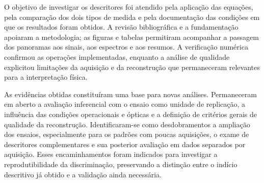 O objetivo de investigar os descritores foi atendido pela aplicação das equações, pela
comparação dos dois tipos de medida e pela documentação das condições em que os resultados
foram obtidos. A revisão bibliográfica e a fundamentação apoiaram a metodologia; as figuras
e tabelas permitiram acompanhar a passagem dos panoramas aos sinais, aos espectros e aos
resumos. A verificação numérica confirmou as operações implementadas, enquanto a análise
de qualidade explicitou limitações da aquisição e da reconstrução que permaneceram
relevantes para a interpretação física.

As evidências obtidas constituíram uma base para novas análises. Permaneceram em aberto a
avaliação inferencial com o ensaio como unidade de replicação, a influência das condições
operacionais e ópticas e a definição de critérios gerais de qualidade da reconstrução.
Identificaram-se como desdobramentos a ampliação dos ensaios, especialmente para os padrões
com poucas aquisições, o exame de descritores complementares e sua posterior avaliação em
dados separados por aquisição. Esses encaminhamentos foram indicados para investigar a
reprodutibilidade da discriminação, preservando a distinção entre o indício descritivo já
obtido e a validação ainda necessária.
